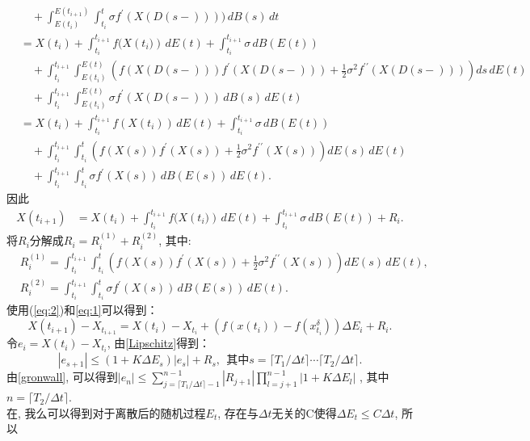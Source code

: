 \documentclass[12pt, final]{article}
\makeatletter
\numberwithin{equation}{section}
\numberwithin{figure}{section}
\numberwithin{table}{section}
\theoremstyle{plain}
\renewcommand{\proofname}{证明}
\theoremstyle{Definition}
\theoremstyle{Remark}
\renewenvironment{proof}[1][\proofname]{\par
	\pushQED{\qed}%
	\normalfont \topsep6\p@\@plus6\p@\relax
	\trivlist\item[\hskip\labelsep
	\bfseries #1\@addpunct{\, :\, }]\ignorespaces
}{%
	\popQED\endtrivlist\@endpefalse
}
\makeatother
\begin{document}
\begin{proof}
\begin{align*}
			&\quad + \int_{E(t_i)}^{E(t_{i+1})} \int_{t_i}^{t}\sigma f^{\prime}(X(D(s-)))) \, dB(s) \, dt \\
			&= X(t_i) + \int_{t_i}^{t_{i+1}} f(X({t_i)}) \, dE(t) + \int_{t_i}^{t_{i+1}} \sigma \, dB(E(t)) \\
			&\quad + \int_{t_i}^{t_{i+1}} \int_{E(t_i)}^{E(t)} \left( f(X(D(s-))) f^{\prime}(X(D(s-))) + \frac{1}{2} \sigma^2 f^{\prime\prime}(X(D(s-))) \right) ds \, dE(t) \\
			&\quad + \int_{t_i}^{t_{i+1}} \int_{E(t_i)}^{E(t)}\sigma f^{\prime}(X(D(s-))) \, dB(s) \, dE(t)\\
			&= X(t_i) + \int_{t_i}^{t_{i+1}} f(X({t_i})) \, dE(t) + \int_{t_i}^{t_{i+1}} \sigma \, dB(E(t)) \\
			&\quad + \int_{t_i}^{t_{i+1}} \int_{t_i}^{t} \left( f(X(s)) f^{\prime}(X(s)) + \frac{1}{2} \sigma^2 f^{\prime\prime}(X(s)) \right) dE(s) \, dE(t) \\
			&\quad + \int_{t_i}^{t_{i+1}} \int_{t_i}^{t}\sigma f^{\prime}(X(s)) \, dB(E(s)) \, dE(t). 
		\end{align*}
		因此
		\begin{align}\label{eq:2}
			X(t_{i+1})
			&= X(t_i) + \int_{t_i}^{t_{i+1}} f(X({t_i)}) \, dE(t) + \int_{t_i}^{t_{i+1}} \sigma \, dB(E(t)) + R_i. 
		\end{align}
		将$R_i$分解成$R_i = R_i^{(1)} + R_i^{(2)}$, 其中:
		\begin{align*}
			& R_i^{(1)} = \int_{t_i}^{t_{i+1}} \int_{t_i}^{t} \left( f(X(s)) f^{\prime}(X(s)) + \frac{1}{2} \sigma^2 f^{\prime\prime}(X(s)) \right) dE(s) \, dE(t), \\
			& R_i^{(2)} = \int_{t_i}^{t_{i+1}} \int_{t_i}^{t} \sigma f^{\prime}(X(s)) \, dB(E(s)) \, dE(t). 
		\end{align*}
		使用(\ref{eq:2})和\eqref{eq:1}可以得到：
		\begin{equation}
			X({t_{i+1}})-X_{t_{i+1}}=X({t_i})-X_{t_i}+(f{(x({t_i}))}-f{(x^\delta_{t_i})})\Delta E_{i}+R_{i}. 
		\end{equation}
		令$e_i = X({t_i})-X_{t_i}$, 由\cref{Lipschitz}得到：
		\begin{equation}
			|e_{s+1}|\leq(1+K{\Delta}E_{s})|e_{s}|+R_{s}, ~~\text{其中}s=\lceil T_1/\Delta t \rceil\cdots \lceil T_2 /\Delta t \rceil. 
		\end{equation}
		由\cref{gronwall}, 可以得到$|e_n| \leq \sum\limits_{j=\lceil T_1/\Delta t \rceil-1}^{n-1}|R_{j+1}|\prod\limits_{l=j+1}^{n-1}|1+K\Delta E_l|$
		, 其中$n = \lceil T_2/\Delta t \rceil$. \\
		在\cite{li2023convergence}, 我么可以得到对于离散后的随机过程$E_t$, 存在与$\Delta t$无关的C使得$\Delta E_t \le C \Delta t$, 所以
		

\end{proof}
\end{document}
